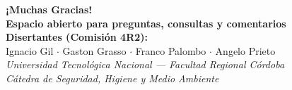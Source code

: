 
\begin{frame}[standout]
  \Huge\textbf{¡Muchas Gracias!}\\[0.6cm]
  \normalsize\textbf{Espacio abierto para preguntas, consultas y comentarios}\\[0.5cm]
  \scriptsize
  \textbf{Disertantes (Comisión 4R2):}\\
  Ignacio Gil $\cdot$ Gaston Grasso $\cdot$ Franco Palombo $\cdot$ Angelo Prieto\\[0.2cm]
  \textit{Universidad Tecnológica Nacional --- Facultad Regional Córdoba}\\
  \textit{Cátedra de Seguridad, Higiene y Medio Ambiente}
\end{frame}
